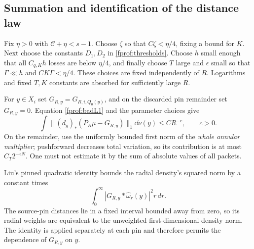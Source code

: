 

\subsection{Summation and identification of the distance law}

Fix \(\eta>0\) with \(\mathcal C+\eta<s-1\). Choose \(\zeta\) so that \(C\zeta<\eta/4\), fixing a bound for \(K\). Next choose the constants \(D_1,D_2\) in \eqref{fprof:thresholds}. Choose \(h\) small enough that all \(C_{q,K}h\) losses are below \(\eta/4\), and finally choose \(T\) large and \(\epsilon\) small so that \(\Gamma\ll h\) and \(CK\Gamma<\eta/4\). These choices are fixed independently of \(R\). Logarithms and fixed \(T,K\) constants are absorbed for sufficiently large \(R\).

For \(y\in X_i\) set \(G_{R,y}=G_{R,i,Q_0(y)}\), and on the discarded pin remainder set \(G_{R,y}=0\). Equation \eqref{fprof:badL1} and the parameter choices give
\begin{equation}\label{fprof:jointL1}
 \int\|(d_y)_*(P_R\mu-G_{R,y})\|_1\dd\nu(y)\leq C R^{-c},
 \qquad c>0.
\end{equation}
On the remainder, use the uniformly bounded first norm of the \emph{whole annular multiplier}; pushforward decreases total variation, so its contribution is at most \(C_T2^{-\epsilon N}\). One must not estimate it by the sum of absolute values of all packets.

Liu's pinned quadratic identity \cite{liuidentity} bounds the radial density's squared norm by a constant times
$$
 \int_0^\infty |G_{R,y}*\widehat\omega_r(y)|^2r\,dr.
$$
The source-pin distances lie in a fixed interval bounded away from zero, so its radial weights are equivalent to the unweighted first-dimensional density norm. The identity is applied separately at each pin and therefore permits the dependence of \(G_{R,y}\) on \(y\).

